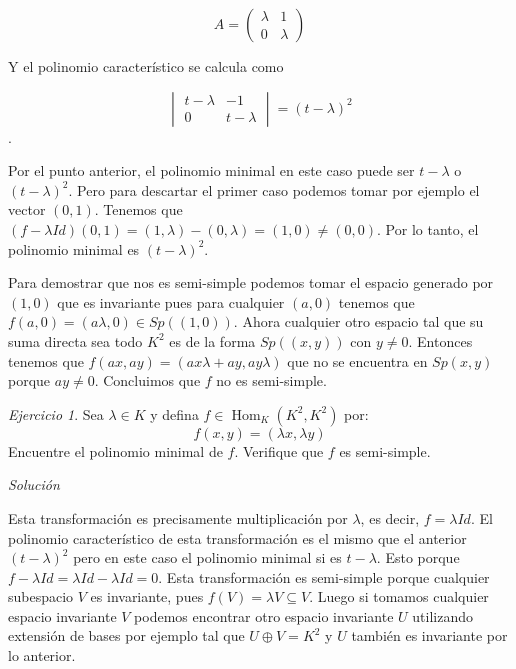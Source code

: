 \documentclass[11pt,a4paper]{article}
\theoremstyle{definition}
\theoremstyle{remark}
\newtheorem{exc}{Ejercicio}
\newcommand{\Hom}{\operatorname{Hom}}
\begin{document}
\begin{equation}
A=\begin{pmatrix}
\lambda & 1
\\0 & \lambda
\end{pmatrix} \nonumber
\end{equation}

Y el polinomio característico se calcula como

\begin{equation}
\begin{vmatrix}
t-\lambda & -1
\\0 & t- \lambda
\end{vmatrix} = (t-\lambda)^2 \nonumber
\end{equation}.

Por el punto anterior, el polinomio minimal en este caso puede ser $ t-\lambda $ o $ (t-\lambda)^2 $. Pero para descartar el primer caso podemos tomar por ejemplo el vector $ (0,1) $. Tenemos que $ (f-\lambda Id)(0,1)=(1,\lambda)-(0,\lambda)=(1,0) \not = (0,0)$. Por lo tanto, el polinomio minimal es $ (t-\lambda)^2 $.

Para demostrar que nos es semi-simple podemos tomar el espacio generado por $ (1,0) $ que es invariante pues para cualquier $ (a,0) $ tenemos que $ f(a,0)=(a\lambda,0)\in Sp((1,0)) $. Ahora cualquier otro espacio tal que su suma directa sea todo $ K^2 $ es de la forma $ Sp((x,y)) $ con $ y \not = 0 $. Entonces tenemos que $ f(ax,ay)=(ax\lambda+ay,ay\lambda) $ que no se encuentra en $ Sp(x,y) $ porque $ ay \not = 0 $. Concluimos que $ f $ no es semi-simple. 
\begin{exc}
	Sea $ \lambda \in K $ y defina $ f \in \Hom_K(K^2, K^2) $ por:
	\[ f(x,y) = (\lambda x, \lambda y) \]
	Encuentre el polinomio minimal de $ f $. Verifique que $ f $ es semi-simple.
\end{exc}

\textit{Solución}

Esta transformación es precisamente multiplicación por $ \lambda $, es decir, $ f= \lambda Id $. El polinomio característico de esta transformación es el mismo que el anterior $ (t- \lambda)^2 $ pero en este caso el polinomio minimal si es $ t-\lambda $. Esto porque $ f-\lambda Id = \lambda Id - \lambda Id = 0 $. Esta transformación es semi-simple porque cualquier subespacio $ V $ es invariante, pues $ f(V)= \lambda V \subseteq V $. Luego si tomamos cualquier espacio invariante $ V $ podemos encontrar otro espacio invariante $ U $ utilizando extensión de bases por ejemplo tal que $ U \oplus V = K^2 $ y $ U $ también es invariante por lo anterior.
\end{document}
